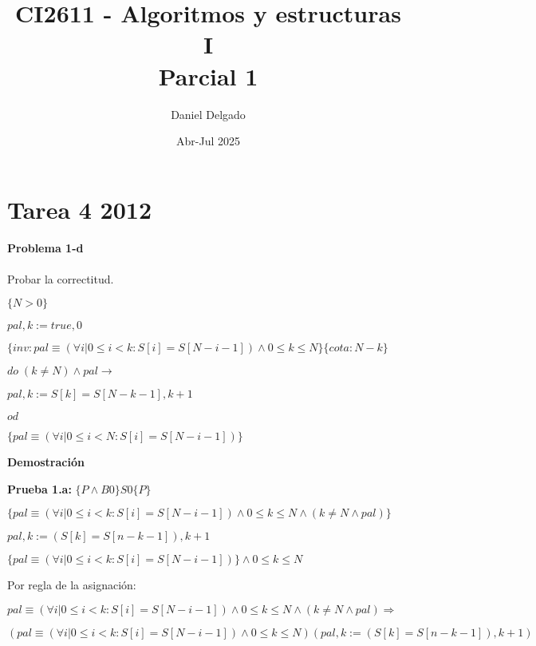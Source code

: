 \documentclass{article}
\author{}
\title{CI2611 - Algoritmos y estructuras I \\ Parcial 1}
\date{Abr-Jul 2025}
\author{Daniel Delgado}
\begin{document}
\maketitle

\section*{Tarea 4 2012}

\paragraph{Problema 1-d} \par

Probar la correctitud.\par

$\{N>0\}$\par 
$pal, k := true, 0$ \par
$\{inv: pal \equiv (\forall i|0 \leq i < k : S[i]=S[N-i-1]) \land 0 \leq k \leq N\}\{cota: N-k\}$ \par 
$do \; (k \neq N) \land pal \rightarrow$ \par 
\hspace{1em} $pal, k := S[k]=S[N-k-1], k+1$ \par 
$od$\par
$\{pal \equiv (\forall i|0 \leq i < N : S[i]=S[N-i-1])\}$ \par

\newpage

\textbf{Demostración}\par

\vspace{1em}

\textbf{Prueba 1.a:} $\{P \land B0 \} S0 \{P\}$ \par
$\{pal \equiv (\forall i | 0 \leq i < k : S[i]=S[N-i-1]) \land 0 \leq k \leq N \land (k \neq N \land pal)\}$ \par 
\hspace{0.5em} $pal, k := (S[k]=S[n-k-1]), k+1$ \par 
$\{pal \equiv (\forall i | 0 \leq i < k : S[i]=S[N-i-1]) \} \land 0 \leq k \leq N$ \par 

\vspace{1em}

Por regla de la asignación: \par

$pal \equiv (\forall i | 0 \leq i < k : S[i]=S[N-i-1]) \land 0 \leq k \leq N \land (k \neq N \land pal) \Rightarrow$ \par
$(pal \equiv (\forall i | 0 \leq i < k : S[i]=S[N-i-1]) \land 0 \leq k \leq N )(pal, k := (S[k]=S[n-k-1]), k+1)$ \par
\end{document}
